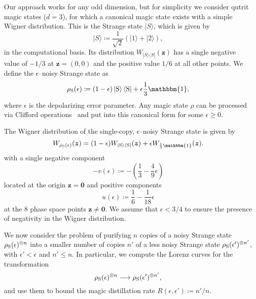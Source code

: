 \documentclass[
onecolumn,
superscriptaddress
]{revtex4-1}
\def\>{\rangle}
\def\<{\langle}
\def\id{\mathbbm{1}}
\def\bmo{\boldsymbol{0}}
\def\z{\boldsymbol{z}}
\begin{document}
Our approach works for any odd dimension, but for simplicity we consider qutrit magic states ($d=3$), for which a canonical magic state exists with a simple Wigner distribution. This is the Strange state $|S\>$, which is given by
\begin{equation}
|S\> \coloneqq \frac{1}{\sqrt{2}} (|1\> + |2\>),
\end{equation}
in the computational basis. Its distribution $W_{|S\>\<S|}(\z)$ has a single negative value of $-1/3$ at $\z =(0,0)$ and the positive value $1/6$ at all other points. We define the $\epsilon$--noisy Strange state as
\begin{equation}\label{eq:noisysn}
    \rho_{\rm{S}}(\epsilon)\coloneqq (1 - \epsilon) \ket{\rm{S}}\bra{\rm{S}} + \epsilon \frac{1}{3}\id,
\end{equation}
where $\epsilon$ is the depolarizing error parameter. Any magic state $\rho$ can be processed via Clifford operations~\cite{cit:prakash,cit:prakash2} and put into this canonical form for some $\epsilon \ge 0$.

The Wigner distribution of the single-copy, $\epsilon$--noisy Strange state  is given by
\begin{equation}
	W_{\rho_{\rm{S}}(\epsilon)}(\z) = (1-\epsilon)W_{|\rm{S}\>\<\rm{S}|}(\z) + \epsilon W_{\frac{1}{3}\id}(\z).
\end{equation}
with a single negative component
\begin{equation}
	- v(\epsilon) \coloneqq - \left( \frac{1}{3} -\frac{4}{9}\epsilon \right)
\end{equation} 
located at the origin $\z = \bmo$ and positive components
\begin{equation}
	u(\epsilon) \coloneqq \frac{1}{6} -\frac{1}{18}\epsilon
\end{equation}
at the 8 phase space points $\z \ne \bmo$. We assume that $\epsilon < 3/4$ to ensure the presence of negativity in the Wigner distribution. 

We now consider the problem of purifying $n$ copies of a noisy Strange state $\rho_{\rm{S}}(\epsilon)^{\otimes n}$ into a smaller number of copies $n'$ of a less noisy Strange state $\rho_{\rm{S}}(\epsilon')^{\otimes n'}$, with $\epsilon' < \epsilon$ and $n' \leq n$. In particular, we compute the Lorenz curves for the transformation
\begin{equation}\label{eq:sudist}
	\rho_{\rm{S}}(\epsilon)^{\otimes n} \longrightarrow \rho_{\rm{S}}(\epsilon')^{\otimes n'},
\end{equation}
and use them to bound the magic distillation rate $R(\epsilon, \epsilon') \coloneqq n'/n$.
\end{document}
